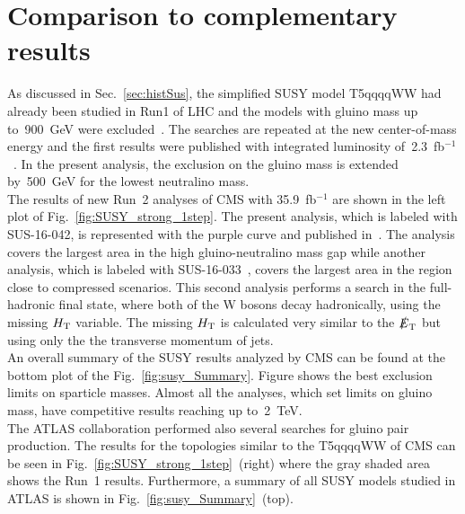 \section{Comparison to complementary results}
\label{sec:Comparison}
As discussed in Sec.~\ref{sec:histSus}, the simplified SUSY model T5qqqqWW had already been studied in Run1 of LHC and the models with gluino mass up to~900~GeV were excluded~\cite{SUSRun1}. The searches are repeated at the new center-of-mass energy and the first results were published with integrated luminosity of~2.3~fb$^{-1}$~\cite{SUS_16_005}. In the present analysis, the exclusion on the gluino mass is extended by~500~GeV for the lowest neutralino mass.\\
The results of new Run~2 analyses of CMS with 35.9~fb$^{-1}$ are shown in the left plot of Fig.~\ref{fig:SUSY_strong_1step}. The present analysis, which is labeled with SUS-16-042, is represented with the purple curve and published in~\cite{SUS_16_042}. The analysis covers the largest area in the high gluino-neutralino mass gap while another analysis, which is labeled with SUS-16-033~\cite{SUS_16_033}, covers the largest area in the region close to compressed scenarios. This second analysis performs a search in the full-hadronic final state, where both of the W bosons decay hadronically, using the missing $H_{\rm T}$ variable. The missing $H_{\rm T}$ is calculated very similar to the $\slashed{E}_{\rm T}$ but using only the the transverse momentum of jets.\\
An overall summary of the SUSY results analyzed by CMS can be found at the bottom plot of the Fig.~\ref{fig:susy_Summary}. Figure shows the best exclusion limits on sparticle masses. Almost all the analyses, which set limits on gluino mass, have competitive results reaching up to~2~TeV. \\
The ATLAS collaboration performed also several searches for gluino pair production. The results for the topologies similar to the T5qqqqWW of CMS can be seen in Fig.~\ref{fig:SUSY_strong_1step}~(right) where the gray shaded area shows the Run~1 results. Furthermore, a summary of all SUSY models studied in ATLAS is shown  in Fig.~\ref{fig:susy_Summary}~(top). \\

